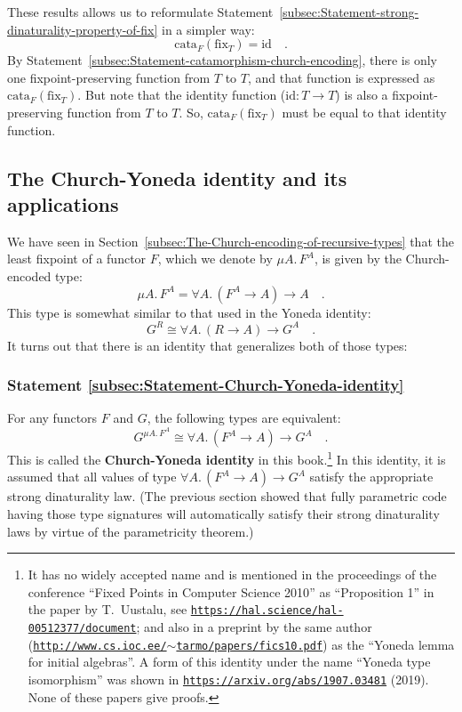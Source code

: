 These results allows us to reformulate Statement~\ref{subsec:Statement-strong-dinaturality-property-of-fix}
in a simpler way:
\[
\text{cata}_{F}(\text{fix}_{T})=\text{id}\quad.
\]
By Statement~\ref{subsec:Statement-catamorphism-church-encoding},
there is only one fixpoint-preserving function from $T$ to $T$,
and that function is expressed as $\text{cata}_{F}(\text{fix}_{T})$.
But note that the identity function ($\text{id}:T\rightarrow T$)
is also a fixpoint-preserving function from $T$ to $T$. So, $\text{cata}_{F}(\text{fix}_{T})$
must be equal to that identity function.

\subsection{The Church-Yoneda identity and its applications\label{subsec:The-Church-Yoneda-identity}}

We have seen in Section~\ref{subsec:The-Church-encoding-of-recursive-types}
that the least fixpoint of a functor $F$, which we denote by $\mu A.\,F^{A}$,
is given by the Church-encoded type:
\[
\mu A.\,F^{A}=\forall A.\,(F^{A}\rightarrow A)\rightarrow A\quad.
\]
This type is somewhat similar to that used in the Yoneda identity:
\[
G^{R}\cong\forall A.\,(R\rightarrow A)\rightarrow G^{A}\quad.
\]
It turns out that there is an identity that generalizes both of those
types:

\subsubsection{Statement \label{subsec:Statement-Church-Yoneda-identity}\ref{subsec:Statement-Church-Yoneda-identity}}

For any functors $F$ and $G$, the following types are equivalent:
\[
G^{\mu A.\,F^{A}}\cong\forall A.\,(F^{A}\rightarrow A)\rightarrow G^{A}\quad.
\]
This is called the \textbf{Church-Yoneda
identity} in this book.\footnote{It has no widely accepted name and is mentioned in the proceedings
of the conference \textsf{``}Fixed Points in Computer Science 2010\textsf{''} as \textsf{``}Proposition
1\textsf{''} in the paper by T.~Uustalu, see \texttt{\href{https://hal.science/hal-00512377/document}{https://hal.science/hal-00512377/document}};
and also in a preprint by the same author (\texttt{\href{https://web.archive.org/web/20110601105059/http://www.cs.ioc.ee/~tarmo/papers/fics10.pdf}{http://www.cs.ioc.ee/$\sim$tarmo/papers/fics10.pdf}})
as the \textsf{``}Yoneda lemma for initial algebras\textsf{''}. A form of this identity
under the name \textsf{``}Yoneda type isomorphism\textsf{''} was shown in \texttt{\href{https://arxiv.org/abs/1907.03481}{https://arxiv.org/abs/1907.03481}}
(2019). None of these papers give proofs.} In this identity, it is assumed that all values of type $\forall A.\,(F^{A}\rightarrow A)\rightarrow G^{A}$
satisfy the appropriate strong dinaturality law. (The previous section
showed that fully parametric code having those type signatures will
automatically satisfy their strong dinaturality laws by virtue of
the parametricity theorem.)

